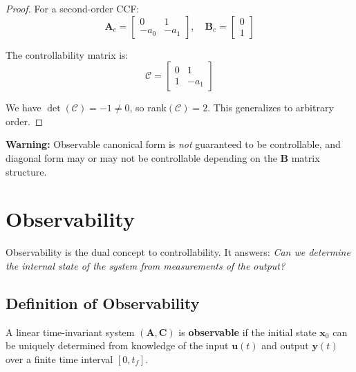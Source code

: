 \begin{proof}
For a second-order CCF:
\begin{equation}
\mathbf{A}_c = \begin{bmatrix} 0 & 1 \\ -a_0 & -a_1 \end{bmatrix}, \quad \mathbf{B}_c = \begin{bmatrix} 0 \\ 1 \end{bmatrix}
\end{equation}

The controllability matrix is:
\begin{equation}
\mathcal{C} = \begin{bmatrix} 0 & 1 \\ 1 & -a_1 \end{bmatrix}
\end{equation}

We have $\det(\mathcal{C}) = -1 \neq 0$, so rank$(\mathcal{C}) = 2$. This generalizes to arbitrary order.
\end{proof}

\textbf{Warning:} Observable canonical form is \textit{not} guaranteed to be controllable, and diagonal form may or may not be controllable depending on the $\mathbf{B}$ matrix structure.

\section{Observability}
\label{sec:observability}

Observability is the dual concept to controllability. It answers: \textit{Can we determine the internal state of the system from measurements of the output?}

\subsection{Definition of Observability}

\begin{definition}[Observability]
A linear time-invariant system $(\mathbf{A}, \mathbf{C})$ is \textbf{observable} if the initial state $\mathbf{x}_0$ can be uniquely determined from knowledge of the input $\mathbf{u}(t)$ and output $\mathbf{y}(t)$ over a finite time interval $[0, t_f]$.
\end{definition}

